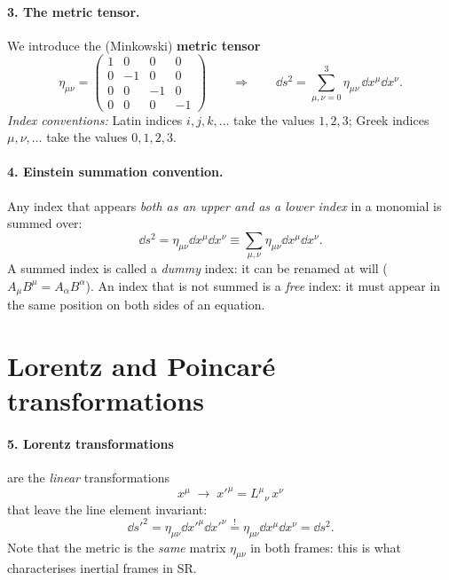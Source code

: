 \paragraph{3. The metric tensor.} We introduce the (Minkowski) \textbf{metric tensor}
\begin{equation}
  \eta_{\mu\nu}=\begin{pmatrix} 1&0&0&0\\0&-1&0&0\\0&0&-1&0\\0&0&0&-1\end{pmatrix}
  \qquad\Longrightarrow\qquad
  \dd s^2=\sum_{\mu,\nu=0}^{3}\eta_{\mu\nu}\,\dd x^\mu\dd x^\nu .
\end{equation}
\textit{Index conventions:} Latin indices $i,j,k,\dots$ take the values $1,2,3$; Greek indices $\mu,\nu,\dots$ take the values $0,1,2,3$.

\paragraph{4. Einstein summation convention.} Any index that appears \emph{both as an upper and as a lower index} in a monomial is summed over:
\begin{equation}
  \dd s^2=\eta_{\mu\nu}\dd x^\mu\dd x^\nu\equiv\sum_{\mu,\nu}\eta_{\mu\nu}\dd x^\mu\dd x^\nu .
\end{equation}
A summed index is called a \emph{dummy} index: it can be renamed at will ($A_\mu B^\mu=A_\alpha B^\alpha$). An index that is not summed is a \emph{free} index: it must appear in the same position on both sides of an equation.

\section{Lorentz and Poincaré transformations}

\paragraph{5. Lorentz transformations} are the \emph{linear} transformations
\begin{equation}
  x^\mu\;\longrightarrow\; x'^\mu = L^\mu{}_\nu\,x^\nu
\end{equation}
that leave the line element invariant:
\begin{equation}
  \dd s'^2=\eta_{\mu\nu}\dd x'^\mu\dd x'^\nu \overset{!}{=}\eta_{\mu\nu}\dd x^\mu\dd x^\nu=\dd s^2 .
\end{equation}
Note that the metric is the \emph{same} matrix $\eta_{\mu\nu}$ in both frames: this is what characterises inertial frames in SR.

